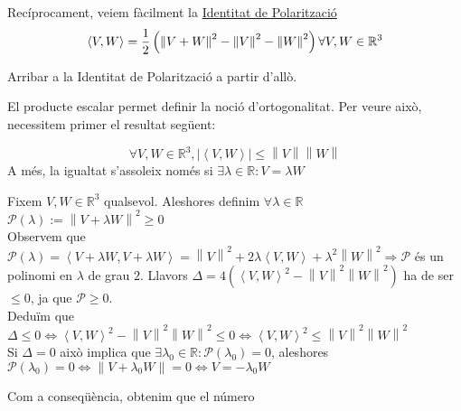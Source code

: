 \documentclass[../main.tex]{subfiles}
\begin{document}
Recíprocament, veiem fàcilment la \underline{Identitat de Polarització}
\begin{displaymath}
    \left\langle V, W\right\rangle = \frac{1}{2}\left(\left\lVert V+W\right\rVert^2 - \left\lVert V\right\rVert^2 - \left\lVert W\right\rVert^2\right)\\
    \forall V, W \in \mathbb{R}^3
\end{displaymath}
\begin{exercici}
    Arribar a la Identitat de Polarització a partir d'allò.
\end{exercici}
El producte escalar permet definir la noció d'ortogonalitat. Per veure això, necessitem primer el
resultat següent:
\begin{teorema}
    \begin{displaymath}
        \forall V, W \in \mathbb{R}^3, \left\lvert \left\langle V, W\right\rangle \right\rvert \leq \left\lVert V\right\rVert \left\lVert W\right\rVert
    \end{displaymath}
    A més, la igualtat s'assoleix només si $\exists \lambda \in \mathbb{R}: V = \lambda W$
\end{teorema}
\begin{demostracio}
    Fixem $V, W \in \mathbb{R}^3$ qualsevol. Aleshores definim $\forall\lambda\in\mathbb{R}$\\$\mathcal{P}(\lambda):=\left\lVert V+\lambda W\right\rVert^2 \geq 0$\\
    Observem que $\mathcal{P}(\lambda)=\left\langle V+\lambda W, V+\lambda W\right\rangle = \left\lVert V\right\rVert^2 + 2\lambda\left\langle V,W\right\rangle + \lambda^2\left\lVert W\right\rVert^2 \Rightarrow \mathcal{P}$
    és un polinomi en $\lambda$ de grau $2$. Llavors $\Delta = 4\left(\left\langle V,W\right\rangle^2 - \left\lVert V\right\rVert^2\left\lVert W\right\rVert^2\right)$ ha de ser $\leq 0$, ja que $\mathcal{P} \geq 0$.\\
    Deduïm que $\Delta \leq 0 \iff \left\langle V, W\right\rangle^2-\left\lVert V\right\rVert^2\left\lVert W\right\rVert^2 \leq 0 \iff \left\langle V, W\right\rangle^2\leq\left\lVert V\right\rVert^2\left\lVert W\right\rVert^2$\\
    Si $\Delta = 0$ això implica que $\exists \lambda_0 \in \mathbb{R} : \mathcal{P}\left(\lambda_0\right) = 0$, aleshores $\mathcal{P}\left(\lambda_0\right) = 0 \iff \left\lVert V+\lambda_0 W\right\rVert = 0 \iff V = - \lambda_0 W$
\end{demostracio}
Com a conseqüència, obtenim que el número
\end{document}
